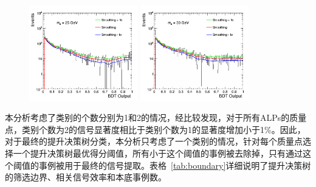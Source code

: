\begin{figure}[htbp]
  \begin{center}
		\includegraphics[width=0.42\textwidth]{figures/chapter04/bkg_smooth/M25_all_DYJetsToLL_SR.png}
        \includegraphics[width=0.42\textwidth]{figures/chapter04/bkg_smooth/M30_all_DYJetsToLL_SR.png} \\
    \label{fig:bkg_smooth3}
\end{center}
\end{figure}

本分析考虑了类别的个数分别为1和2的情况，经比较发现，对于所有ALPs的质量点，类别个数为2的信号显著度相比于类别个数为1的显著度增加小于1\%。因此，对于最终的提升决策树分类，本分析只考虑了一个类别的情况，针对每个质量点选择一个提升决策树最优得分阈值，所有小于这个阈值的事例被去除掉，只有通过这个阈值的事例被用于最终的信号提取。表格~\ref{tab:boundary}详细说明了提升决策树的筛选边界、相关信号效率和本底事例数。

